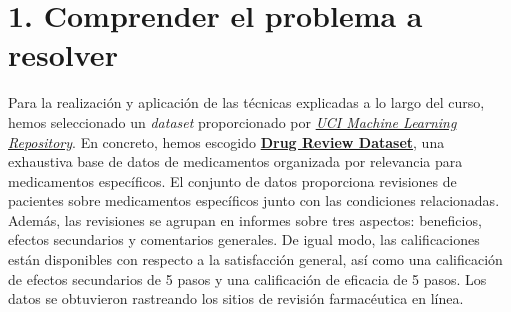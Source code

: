 \documentclass[spanish,]{article}
\begin{document}
\vspace{0.15cm}


\vspace{0.15cm}


\vspace{0.15cm}


\vspace{0.15cm}

\newpage 

\thispagestyle{empty} \tableofcontents
\newpage 

\thispagestyle{empty} \listoffigures
\newpage 

\thispagestyle{empty} \listoftables
\newpage 

\pagestyle{fancy} \fancyhf{}  \rhead{\thepage}
\setcounter{page}{1}

\section{1. Comprender el problema a
resolver}\label{comprender-el-problema-a-resolver}

Para la realización y aplicación de las técnicas explicadas a lo largo
del curso, hemos seleccionado un \emph{dataset} proporcionado por
\href{https://archive.ics.uci.edu/ml/index.php}{\emph{UCI Machine
Learning Repository}}. En concreto, hemos escogido
\href{https://archive.ics.uci.edu/ml/datasets/Drug+Review+Dataset+\%28Druglib.com\%29}{\textbf{Drug
Review Dataset}}, una exhaustiva base de datos de medicamentos
organizada por relevancia para medicamentos específicos. El conjunto de
datos proporciona revisiones de pacientes sobre medicamentos específicos
junto con las condiciones relacionadas. Además, las revisiones se
agrupan en informes sobre tres aspectos: beneficios, efectos secundarios
y comentarios generales. De igual modo, las calificaciones están
disponibles con respecto a la satisfacción general, así como una
calificación de efectos secundarios de 5 pasos y una calificación de
eficacia de 5 pasos. Los datos se obtuvieron rastreando los sitios de
revisión farmacéutica en línea.
\end{document}
